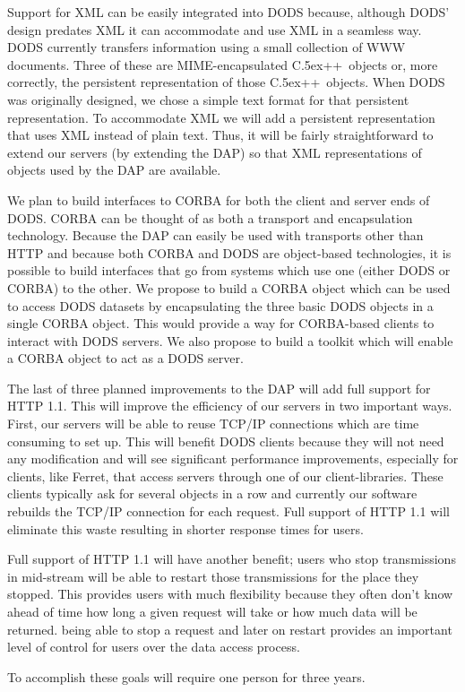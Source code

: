 \documentclass[10pt]{article}
\newcommand{\Cpp}{{\rm {\small C}\raise.5ex\hbox{\footnotesize ++}}}
\begin{document}
Support for XML can be easily integrated into DODS because, although DODS'
design predates XML\cite{w3c:xml} it can accommodate and use XML in a
seamless way. DODS currently transfers information using a small collection
of WWW documents. Three of these are MIME-encapsulated \Cpp\ objects or, more
correctly, the persistent representation of those \Cpp\ objects. When DODS
was originally designed, we chose a simple text format for that persistent
representation. To accommodate XML we will add a persistent representation
that uses XML instead of plain text. Thus, it will be fairly straightforward
to extend our servers (by extending the DAP) so that XML representations of
objects used by the DAP are available.

We plan to build interfaces to CORBA for both the client and server ends of
DODS. CORBA can be thought of as both a transport and encapsulation
technology\cite{siegel:corba-prog}. Because the DAP can easily be used with
transports other than HTTP and because both CORBA and DODS are object-based
technologies, it is possible to build interfaces that go from systems
which use one (either DODS or CORBA) to the other. We propose to build a
CORBA object which can be used to access DODS datasets by encapsulating the
three basic DODS objects in a single CORBA object. This would provide a way
for CORBA-based clients to interact with DODS servers. We also propose to
build a toolkit which will enable a CORBA object to act as a DODS server.

The last of three planned improvements to the DAP will add full support for
HTTP 1.1. This will improve the efficiency of our servers in two important
ways. First, our servers will be able to reuse TCP/IP connections which are
time consuming to set up. This will benefit DODS clients because they will
not need any modification and will see significant performance improvements,
especially for clients, like Ferret, that access servers through one of our
client-libraries. These clients typically ask for several objects in a row
and currently our software rebuilds the TCP/IP connection for each request.
Full support of HTTP 1.1 will eliminate this waste resulting in shorter
response times for users. 

Full support of HTTP 1.1 will have another benefit; users who stop
transmissions in mid-stream will be able to restart those transmissions for
the place they stopped. This provides users with much flexibility because
they often don't know ahead of time how long a given request will take or how
much data will be returned. being able to stop a request and later on restart
provides an important level of control for users over the data access process.

To accomplish these goals will require one person for three years.

\raggedright

\end{document}
